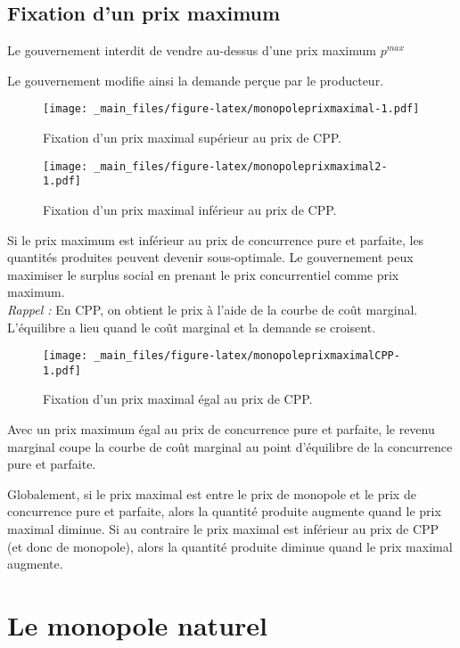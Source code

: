 \documentclass[
]{book}
\theoremstyle{definition}
\theoremstyle{definition}
\theoremstyle{definition}
\theoremstyle{definition}
\theoremstyle{remark}
\begin{document}
\hypertarget{fixation-dun-prix-maximum}{%
\subsection{Fixation d'un prix maximum}\label{fixation-dun-prix-maximum}}

Le gouvernement interdit de vendre au-dessus d'une prix maximum \(p^{max}\)

Le gouvernement modifie ainsi la demande perçue par le producteur.

\begin{figure}
\centering
\texttt{[image: \_main\_files/figure-latex/monopoleprixmaximal-1.pdf]}
\caption{\label{fig:monopoleprixmaximal}Fixation d'un prix maximal supérieur au prix de CPP.}
\end{figure}

\begin{figure}
\centering
\texttt{[image: \_main\_files/figure-latex/monopoleprixmaximal2-1.pdf]}
\caption{\label{fig:monopoleprixmaximal2}Fixation d'un prix maximal inférieur au prix de CPP.}
\end{figure}

Si le prix maximum est inférieur au prix de concurrence pure et parfaite, les quantités produites peuvent devenir sous-optimale.
Le gouvernement peux maximiser le surplus social en prenant le prix concurrentiel comme prix maximum.\\
\emph{Rappel :} En CPP, on obtient le prix à l'aide de la courbe de coût marginal.
L'équilibre a lieu quand le coût marginal et la demande se croisent.

\begin{figure}
\centering
\texttt{[image: \_main\_files/figure-latex/monopoleprixmaximalCPP-1.pdf]}
\caption{\label{fig:monopoleprixmaximalCPP}Fixation d'un prix maximal égal au prix de CPP.}
\end{figure}

Avec un prix maximum égal au prix de concurrence pure et parfaite, le revenu marginal coupe la courbe de coût marginal au point d'équilibre de la concurrence pure et parfaite.

Globalement, si le prix maximal est entre le prix de monopole et le prix de concurrence pure et parfaite, alors la quantité produite augmente quand le prix maximal diminue.
Si au contraire le prix maximal est inférieur au prix de CPP (et donc de monopole), alors la quantité produite diminue quand le prix maximal augmente.

\hypertarget{le-monopole-naturel}{%
\section{Le monopole naturel}\label{le-monopole-naturel}}
\end{document}
